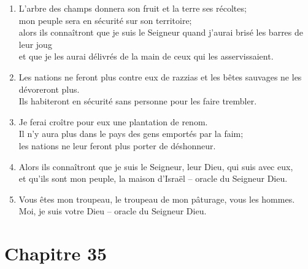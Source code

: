 \begin{enumerate}[leftmargin=\psleftmargin, labelsep = \pslabelsep, label={\arabic*}, font=\color{\pscolor}\small\textsuperscript, parsep=0em, itemsep=0em, topsep=0em ]
\item L’arbre des champs donnera son fruit et la terre ses récoltes; \\ mon peuple sera en sécurité sur son territoire; \\ alors ils connaîtront que je suis le Seigneur quand j’aurai brisé les barres de leur joug \\ et que je les aurai délivrés de la main de ceux qui les asservissaient.
\item Les nations ne feront plus contre eux de razzias et les bêtes sauvages ne les dévoreront plus. \\ Ils habiteront en sécurité sans personne pour les faire trembler.
\item Je ferai croître pour eux une plantation de renom. \\ Il n’y aura plus dans le pays des gens emportés par la faim; \\ les nations ne leur feront plus porter de déshonneur.
\item Alors ils connaîtront que je suis le Seigneur, leur Dieu, qui suis avec eux, \\ et qu’ils sont mon peuple, la maison d’Israël – oracle du Seigneur Dieu.
\item Vous êtes mon troupeau, le troupeau de mon pâturage, vous les hommes. \\ Moi, je suis votre Dieu – oracle du Seigneur Dieu.
\end{enumerate}
\newpage


\section*{Chapitre 35}
